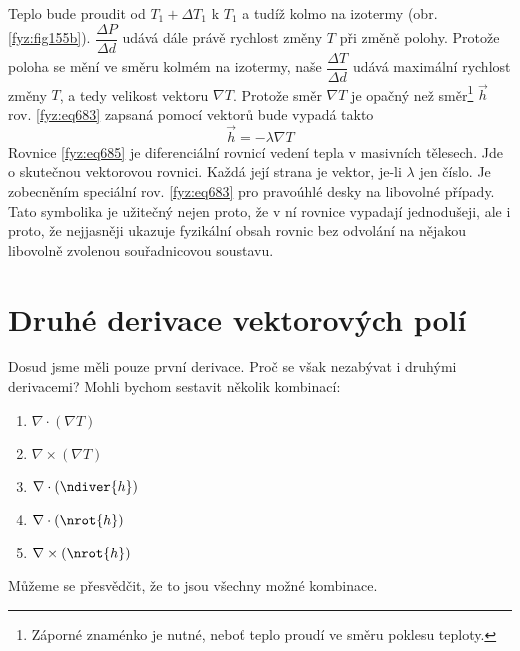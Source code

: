     Teplo bude proudit od $T_1+\Delta T_1$ k $T_1$ a tudíž kolmo na izotermy (obr.
    \ref{fyz:fig155b}). $\dfrac{\Delta P}{\Delta d}$ udává dále právě rychlost změny $T$ při změně
    polohy. Protože poloha se mění ve směru kolmém na izotermy, naše $\dfrac{\Delta T}{\Delta d}$
    udává maximální rychlost změny $T$, a tedy velikost vektoru $\nabla T$. Protože směr $\nabla T$
    je opačný než směr\footnote{Záporné znaménko je nutné, neboť teplo proudí ve směru poklesu
    teploty.} $\vec{h}$  rov. \ref{fyz:eq683} zapsaná pomocí vektorů bude vypadá takto
    \begin{equation}\label{fyz:eq685}
      \vec{h}=-\lambda\nabla T
    \end{equation}
    Rovnice \ref{fyz:eq685} je diferenciální rovnicí vedení tepla v masivních 
    tělesech. Jde o skutečnou vektorovou rovnici. Každá její strana je vektor, je-li $\lambda$ jen 
    číslo. Je zobecněním speciální rov. \ref{fyz:eq683} pro pravoúhlé desky na 
    libovolné případy. Tato symbolika je užitečný nejen proto, že v ní rovnice vypadají 
    jednodušeji, ale i proto, že nejjasněji ukazuje fyzikální obsah rovnic bez odvolání na nějakou 
    libovolně zvolenou souřadnicovou soustavu.      
    
  \section{Druhé derivace vektorových polí}\label{fyz:IIchapIIsecVII}
    Dosud jsme měli pouze první derivace. Proč se však nezabývat i druhými derivacemi? Mohli bychom
    sestavit několik kombinací:
    \begin{enumerate}[leftmargin=2cm,rightmargin=2cm, label=\emph{\alph*}),noitemsep]
      \setlength{\itemsep}{0cm}%
      \setlength{\parskip}{0em}%
      \item $\nabla\cdot(\nabla T)$
      \item $\nabla\times(\nabla T)$
      \item $\nabla\cdot(\ndiver{h})$
      \item $\nabla\cdot(\nrot{h})$
      \item $\nabla\times(\nrot{h})$
    \end{enumerate}
    Můžeme se přesvědčit, že to jsou všechny možné kombinace.
  
